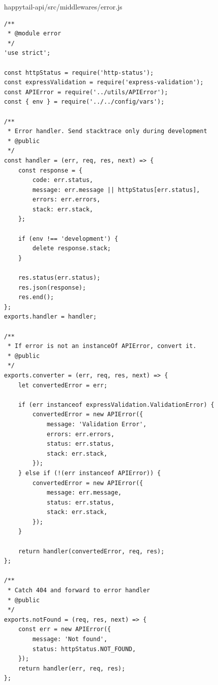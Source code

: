 \documentclass[12pt]{article}
\begin{document}
  \normalsize
 happytail-api/src/middlewares/error.js
 \footnotesize
\begin{verbatim}
/**
 * @module error
 */
'use strict';

const httpStatus = require('http-status');
const expressValidation = require('express-validation');
const APIError = require('../utils/APIError');
const { env } = require('../../config/vars');

/**
 * Error handler. Send stacktrace only during development
 * @public
 */
const handler = (err, req, res, next) => {
    const response = {
        code: err.status,
        message: err.message || httpStatus[err.status],
        errors: err.errors,
        stack: err.stack,
    };

    if (env !== 'development') {
        delete response.stack;
    }

    res.status(err.status);
    res.json(response);
    res.end();
};
exports.handler = handler;

/**
 * If error is not an instanceOf APIError, convert it.
 * @public
 */
exports.converter = (err, req, res, next) => {
    let convertedError = err;

    if (err instanceof expressValidation.ValidationError) {
        convertedError = new APIError({
            message: 'Validation Error',
            errors: err.errors,
            status: err.status,
            stack: err.stack,
        });
    } else if (!(err instanceof APIError)) {
        convertedError = new APIError({
            message: err.message,
            status: err.status,
            stack: err.stack,
        });
    }

    return handler(convertedError, req, res);
};

/**
 * Catch 404 and forward to error handler
 * @public
 */
exports.notFound = (req, res, next) => {
    const err = new APIError({
        message: 'Not found',
        status: httpStatus.NOT_FOUND,
    });
    return handler(err, req, res);
};

 \end{verbatim}
 
\end{document}

